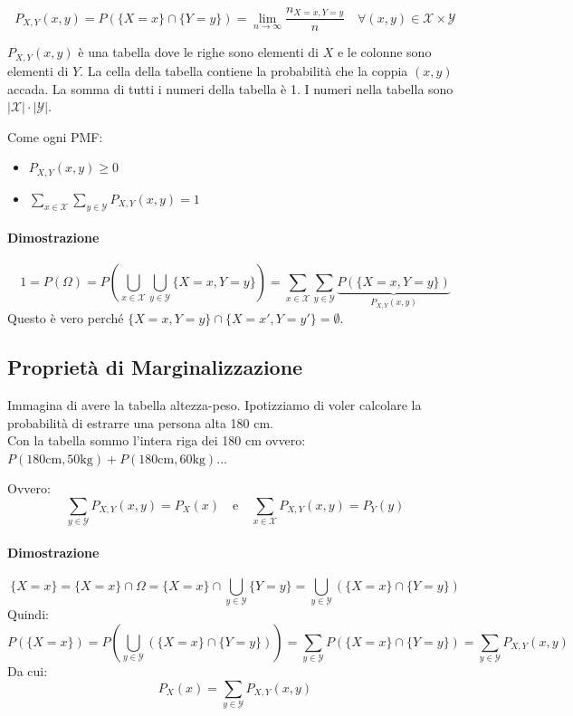 \begin{equation}
P_{X,Y}(x,y) = P(\{X=x\} \cap \{Y=y\}) = \lim_{n \to \infty} \frac{n_{X=x, Y=y}}{n} \quad \forall (x,y) \in \mathcal{X} \times \mathcal{Y}
\end{equation}

$P_{X,Y}(x,y)$ è una tabella dove le righe sono elementi di $X$ e le colonne sono elementi di $Y$. La cella della tabella contiene la probabilità che la coppia $(x,y)$ accada. La somma di tutti i numeri della tabella è 1. I numeri nella tabella sono $|\mathcal{X}| \cdot |\mathcal{Y}|$.

Come ogni PMF:
\begin{itemize}
    \item $P_{X,Y}(x,y) \ge 0$
    \item $\sum_{x \in \mathcal{X}} \sum_{y \in \mathcal{Y}} P_{X,Y}(x,y) = 1$
\end{itemize}

\paragraph{Dimostrazione}
\[
1 = P(\Omega) = P\left(\bigcup_{x \in \mathcal{X}} \bigcup_{y \in \mathcal{Y}} \{X=x, Y=y\}\right) = \sum_{x \in \mathcal{X}} \sum_{y \in \mathcal{Y}} \underbrace{P(\{X=x, Y=y\})}_{P_{X,Y}(x,y)}
\]
Questo è vero perché $\{X=x, Y=y\} \cap \{X=x', Y=y'\} = \emptyset$.

\subsection{Proprietà di Marginalizzazione}

Immagina di avere la tabella altezza-peso. Ipotizziamo di voler calcolare la probabilità di estrarre una persona alta 180 cm.
\\Con la tabella sommo l'intera riga dei 180 cm ovvero: $P(180\text{cm}, 50\text{kg}) + P(180\text{cm}, 60\text{kg}) \dots$

Ovvero:
\begin{equation}
\sum_{y \in \mathcal{Y}} P_{X,Y}(x,y) = P_X(x) \quad \text{e} \quad \sum_{x \in \mathcal{X}} P_{X,Y}(x,y) = P_Y(y)
\end{equation}

\paragraph{Dimostrazione}
\[
\{X=x\} = \{X=x\} \cap \Omega = \{X=x\} \cap \bigcup_{y \in \mathcal{Y}} \{Y=y\} = \bigcup_{y \in \mathcal{Y}} (\{X=x\} \cap \{Y=y\})
\]
Quindi:
\[
P(\{X=x\}) = P\left(\bigcup_{y \in \mathcal{Y}} (\{X=x\} \cap \{Y=y\})\right) = \sum_{y \in \mathcal{Y}} P(\{X=x\} \cap \{Y=y\}) = \sum_{y \in \mathcal{Y}} P_{X,Y}(x,y)
\]
Da cui:
\[
P_X(x) = \sum_{y \in \mathcal{Y}} P_{X,Y}(x,y)
\]

